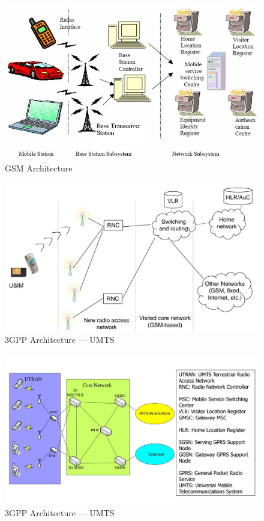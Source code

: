\documentclass[a4paper]{report}
\begin{document}
\begin{figure}
\begin{mdframed}
\includegraphics[scale=0.4]{GSM_Architecture.png}
\caption{GSM Architecture}
\label{fig:prob1a}
\end{mdframed}
\end{figure}

\begin{figure}
\begin{mdframed}
\includegraphics[scale=0.2]{UMTS_Architecture1.jpg}
\caption{3GPP Architecture --- UMTS}
\label{fig:prob1b}
\end{mdframed}
\end{figure}

\begin{figure}
\begin{mdframed}
\includegraphics[scale=0.2]{UMTS_Architecture2.jpg}
\caption{3GPP Architecture --- UMTS}
\label{fig:prob1b}
\end{mdframed}
\end{figure}
\end{document}
